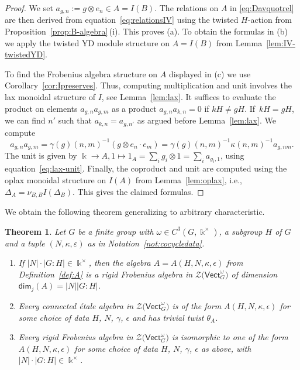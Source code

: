 \documentclass[10pt,a4paper]{amsart}
\numberwithin{equation}{section}
\newtheorem{Theorem}{Theorem}[section]
\renewcommand{\dim}{\mathsf{dim}}
\newcommand{\Vect}{\mathsf{Vect}}
\newcommand{\cZ}{\mathcal{Z}}
\newcommand{\rI}{I}
\begin{document}
\begin{proof}We set $a_{g,n}:=g\otimes e_n\in A=\rI(B)$.
The relations on $A$ in \eqref{eq:Davquotrel} are then derived from equation~\eqref{eq:relationsIV} using the twisted $H$-action from Proposition~\ref{prop:B-algebra}\,(i). This proves (a). To obtain the formulas in (b) we apply the twisted YD module structure on $A=\rI(B)$ from Lemma~\ref{lem:IV-twistedYD}.

To find the Frobenius algebra structure on $A$ displayed in (c) we use Corollary~\ref{cor:Ipreserves}. Thus, computing multiplication and unit involves the lax monoidal structure of $\rI$, see Lemma~\ref{lem:lax}. It suffices to evaluate the product on elements $a_{g,n}a_{g,m}$ as a product $a_{g,n}a_{k,n}=0$ if $kH\neq gH$. If~$kH=gH$, we can find $n'$ such that $a_{k,n}=a_{g,n'}$ as argued before Lemma~\ref{lem:lax}.
We compute
\[a_{g,n}a_{g,m}=\gamma(g)(n,m)^{-1}(g\otimes e_n\cdot e_m)=\gamma(g)(n,m)^{-1}\kappa(n,m)^{-1}a_{g,nm}.\]
The unit is given by $\Bbbk \to A, 1\mapsto 1_A= \sum_{i}g_i\otimes 1=\sum_ia_{g_i,1}$, using equation~\eqref{eq:lax-unit}. Finally, the coproduct and unit are computed using the oplax monoidal structure on $\rI(A)$ from Lemma~\ref{lem:oplax}, i.e., $\Delta_A=\nu_{B,B}\rI(\Delta_B)$. This gives the claimed formulas.
\end{proof}



We obtain the following theorem generalizing \cite[Theorem 3.15]{DS} to arbitrary characteristic.


\begin{Theorem} \label{thm:classification} Let $G$ be a finite group with $\omega\in C^3(G,\Bbbk^\times)$, a subgroup $H$ of $G$ and a tuple $(N,\kappa,\varepsilon)$ as in Notation~{\rm \ref{not:cocycledata}}.
\begin{enumerate}\itemsep=0pt
 \item[$(a)$] If $|N|\cdot|G:H| \in \Bbbk^{\times}$, then the algebra $A=A(H,N,\kappa, \epsilon)$ from Definition~{\rm \ref{def:A}} is a rigid Frobenius algebra in $\cZ\big(\Vect_G^\omega\big)$ of dimension $\dim_j(A)=|N| |G:H|$.
 \item[$(b)$] Every connected \'etale algebra in $\cZ\big(\Vect_G^\omega\big)$ is of the form $A(H,N,\kappa, \epsilon)$ for some choice of data $H$, $N$, $\gamma$, $\epsilon$ and has trivial twist $\theta_A$.
 \item[$(c)$] Every rigid Frobenius algebra in $\cZ\big(\Vect_G^\omega\big)$ is isomorphic to one of the form $A(H,N,\kappa, \epsilon)$ for some choice of data $H$, $N$, $\gamma$, $\epsilon$ as above, with $|N| \cdot |G:H| \in \Bbbk^{\times}$.
\end{enumerate}
\end{Theorem}
\end{document}
